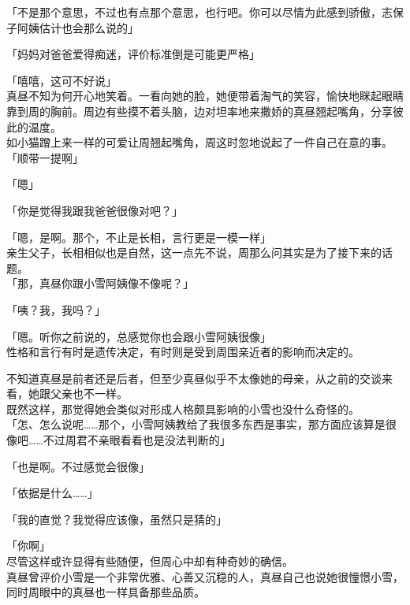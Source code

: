「不是那个意思，不过也有点那个意思，也行吧。你可以尽情为此感到骄傲，志保子阿姨估计也会那么说的」

「妈妈对爸爸爱得痴迷，评价标准倒是可能更严格」

「嘻嘻，这可不好说」\\

真昼不知为何开心地笑着。一看向她的脸，她便带着淘气的笑容，愉快地眯起眼睛靠到周的胸前。周边有些摸不着头脑，边对坦率地来撒娇的真昼翘起嘴角，分享彼此的温度。\\

如小猫蹭上来一样的可爱让周翘起嘴角，周这时忽地说起了一件自己在意的事。\\

「顺带一提啊」

「嗯」

「你是觉得我跟我爸爸很像对吧？」

「嗯，是啊。那个，不止是长相，言行更是一模一样」\\

亲生父子，长相相似也是自然，这一点先不说，周那么问其实是为了接下来的话题。\\

「那，真昼你跟小雪阿姨像不像呢？」

「咦？我，我吗？」

「嗯。听你之前说的，总感觉你也会跟小雪阿姨很像」\\

性格和言行有时是遗传决定，有时则是受到周围亲近者的影响而决定的。

不知道真昼是前者还是后者，但至少真昼似乎不太像她的母亲，从之前的交谈来看，她跟父亲也不一样。\\

既然这样，那觉得她会类似对形成人格颇具影响的小雪也没什么奇怪的。\\

「怎、怎么说呢……那个，小雪阿姨教给了我很多东西是事实，那方面应该算是很像吧……不过周君不亲眼看看也是没法判断的」

「也是啊。不过感觉会很像」

「依据是什么……」

「我的直觉？我觉得应该像，虽然只是猜的」

「你啊」\\

尽管这样或许显得有些随便，但周心中却有种奇妙的确信。\\

真昼曾评价小雪是一个非常优雅、心善又沉稳的人，真昼自己也说她很憧憬小雪，同时周眼中的真昼也一样具备那些品质。

